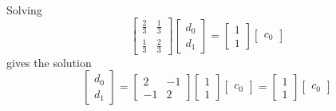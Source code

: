 \begin{indentedexample}
\begin{equation*}
\begin{aligned}
        \end{aligned}
    \end{equation*}
    Solving
    \begin{equation*}
        \begin{bmatrix}
            \frac{2}{3} & \frac{1}{3} \\
            \frac{1}{3} & \frac{2}{3}
        \end{bmatrix}
        \begin{bmatrix}
            d_0 \\
            d_1
        \end{bmatrix}
        =
        \begin{bmatrix}
            1 \\
            1
        \end{bmatrix}
        \begin{bmatrix}
            c_0
        \end{bmatrix}
    \end{equation*}
    gives the solution
    \begin{equation*}
        \begin{bmatrix}
            d_0 \\
            d_1
        \end{bmatrix}
        =
        \begin{bmatrix}
            2 & -1 \\
            -1 & 2
        \end{bmatrix}
        \begin{bmatrix}
            1 \\
            1
        \end{bmatrix}
        \begin{bmatrix}
            c_0
        \end{bmatrix}
        =
        \begin{bmatrix}
            1 \\
            1
        \end{bmatrix}
        \begin{bmatrix}
            c_0
        \end{bmatrix}
    \end{equation*}
\end{indentedexample}

